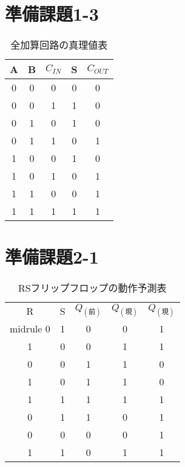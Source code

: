 \documentclass[11pt,a4j]{jsarticle}
\begin{document}
 \newpage
 
 \section{準備課題1-3}
 
 
 \begin{table}[htb]
  \begin{center}
    \caption{全加算回路の真理値表}
    \begin{tabular}{ccccc} \toprule
A & B & $C_{IN}$ & S & $C_{OUT}$ \\ \midrule
0 & 0 & 0 & 0 & 0 \\
0 & 0 & 1 & 1 & 0 \\
0 & 1 & 0 & 1 & 0 \\
0 & 1 & 1 & 0 & 1 \\
1 & 0 & 0 & 1 & 0 \\
1 & 0 & 1 & 0 & 1 \\
1 & 1 & 0 & 0 & 1 \\
1 & 1 & 1 & 1 & 1 \\ \bottomrule
    \end{tabular}
    \label{tab:price}
  \end{center}
\end{table}
 
 
 \section{準備課題2-1}
 
 
 \begin{table}[htb]
  \begin{center}
    \caption{RSフリップフロップの動作予測表}
    \begin{tabular}{ccccc} \toprule
R & S & $Q_(前)$ & $Q_(現)$ & $Q_(現)$ \\ midrule
0 & 1 & 0 & 0 & 1 \\
1 & 0 & 0 & 1 & 1 \\
0 & 0 & 1 & 1 & 0 \\
1 & 0 & 1 & 1 & 0 \\
1 & 1 & 1 & 1 & 1 \\
0 & 1 & 1 & 0 & 1 \\
0 & 0 & 0 & 0 & 1 \\
1 & 1 & 0 & 1 & 1 \\ \bottomrule
    \end{tabular}
    \label{tab:price}
  \end{center}
\end{table}
 
 
 
 
\end{document}
